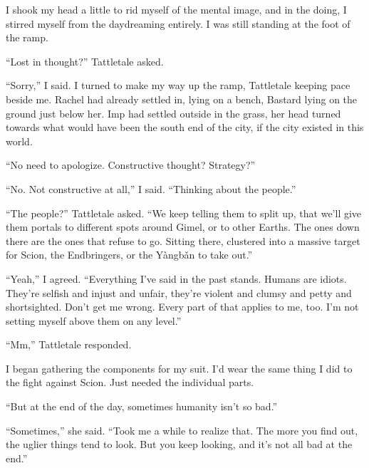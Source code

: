 I shook my head a little to rid myself of the mental image, and in the doing, I stirred myself from the daydreaming entirely.  I was still standing at the foot of the ramp.



``Lost in thought?'' Tattletale asked.



``Sorry,'' I said.  I turned to make my way up the ramp, Tattletale keeping pace beside me.  Rachel had already settled in, lying on a bench, Bastard lying on the ground just below her.  Imp had settled outside in the grass, her head turned towards what would have been the south end of the city, if the city existed in this world.



``No need to apologize.  Constructive thought?  Strategy?''



``No.  Not constructive at all,'' I said.  ``Thinking about the people.''



``The people?'' Tattletale asked.  ``We keep telling them to split up, that we'll give them portals to different spots around Gimel, or to other Earths.  The ones down there are the ones that refuse to go.  Sitting there, clustered into a massive target for Scion, the Endbringers, or the Y\`{a}ngb\v{a}n to take out.''



``Yeah,'' I agreed.  ``Everything I've said in the past stands.  Humans are idiots.  They're selfish and injust and unfair, they're violent and clumsy and petty and shortsighted.  Don't get me wrong.  Every part of that applies to me, too.  I'm not setting myself above them on any level.''



``Mm,'' Tattletale responded.



I began gathering the components for my suit.  I'd wear the same thing I did to the fight against Scion.  Just needed the individual parts.



``But at the end of the day, sometimes humanity isn't so bad.''



``Sometimes,'' she said.  ``Took me a while to realize that.  The more you find out, the uglier things tend to look.  But you keep looking, and it's not all bad at the end.''



